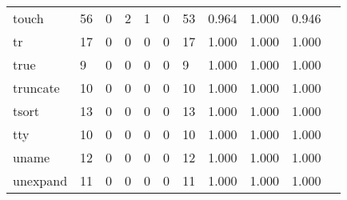 \begin{longtable}{lp{1.10cm}p{1.10cm}p{1.10cm}p{1.10cm}p{1.10cm}p{1.10cm}p{1.10cm}p{1.10cm}p{1.10cm}p{1.10cm}}
touch     &                     56 &                                  0 &                                 2 &                                1 &                                 0 &                              53 &                          0.964 &                                 1.000 &                               0.946 \\
tr        &                     17 &                                  0 &                                 0 &                                0 &                                 0 &                              17 &                          1.000 &                                 1.000 &                               1.000 \\
true      &                      9 &                                  0 &                                 0 &                                0 &                                 0 &                               9 &                          1.000 &                                 1.000 &                               1.000 \\
truncate  &                     10 &                                  0 &                                 0 &                                0 &                                 0 &                              10 &                          1.000 &                                 1.000 &                               1.000 \\
tsort     &                     13 &                                  0 &                                 0 &                                0 &                                 0 &                              13 &                          1.000 &                                 1.000 &                               1.000 \\
tty       &                     10 &                                  0 &                                 0 &                                0 &                                 0 &                              10 &                          1.000 &                                 1.000 &                               1.000 \\
uname     &                     12 &                                  0 &                                 0 &                                0 &                                 0 &                              12 &                          1.000 &                                 1.000 &                               1.000 \\
unexpand  &                     11 &                                  0 &                                 0 &                                0 &                                 0 &                              11 &                          1.000 &                                 1.000 &                               1.000 \\

\end{longtable}
